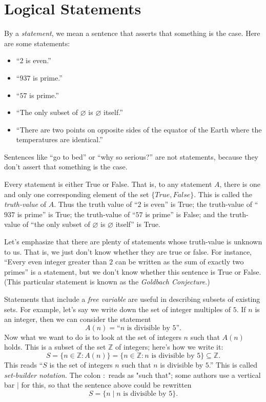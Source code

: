 \documentclass[11pt,dvipsnames]{book}
\numberwithin{figure}{section} %
\numberwithin{table}{section} %
\begin{document}
\section{Logical Statements}

By a \emph{statement}, we mean a sentence that asserts that something is the case.
Here are some statements:
\begin{itemize}
    \item ``$2$ is even.''
    \item ``$937$ is prime.''
    \item ``$57$ is prime.''
    \item ``The only subset of $\varnothing$ is $\varnothing$ itself.''
    \item ``There are two points on opposite sides of the equator of the Earth where the temperatures are identical.''
\end{itemize}
Sentences like ``go to bed'' or ``why so serious?'' are not statements, because they don't assert that something is the case.

Every statement is either True or False.
That is, to any statement $A$, there is one and only one corresponding element of the set $\{True, False\}$.
This is called the \emph{truth-value} of $A$.
Thus the truth value of ``$2$ is even'' is True; the truth-value of ``$937$ is prime'' is True; the truth-value of ``$57$ is prime'' is False; and the truth-value of ``the only subset of $\varnothing$ is $\varnothing$ itself'' is True.

Let's emphasize that there are plenty of statements whose truth-value is unknown to us.
That is, we just don't know whether they are true or false.
For instance, ``Every even integer greater than $2$ can be written as the sum of exactly two primes'' is a statement, but we don't know whether this sentence is True or False.
(This particular statement is known as the \emph{Goldbach Conjecture}.)

Statements that include a \emph{free variable} are useful in describing subsets of existing sets.
For example, let's say we write down the set of integer multiples of $5$.
If $n$ is an integer, then we can consider the statement
\[
    A(n) = \text{``$n$ is divisible by $5$''}.
\]
Now what we want to do is to look at the set of integers $n$ such that $A(n)$ holds.
This is a subset of the set $\mathbb{Z}$ of integers;
here's how we write it:
\[
    S = \{n \in \mathbb{Z} : A(n)\} = \{n \in \mathbb{Z} : n \text{ is divisible by 5}\} \subseteq \mathbb{Z}.
\]
This reads ``$S$ is the set of integers $n$ such that $n$ is divisible by $5$.''
This is called \emph{set-builder notation}.
The colon $:$ reads as "such that";
some authors use a vertical bar $|$ for this, so that the sentence above could be rewritten
\[
S=\{n\; |\; n \text{ is divisible by 5}\}.
\]
\end{document}
